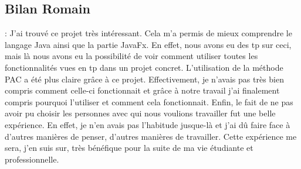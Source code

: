 \subsection{Bilan Romain} : 
J’ai trouvé ce projet très intéressant. Cela m’a permis de mieux comprendre le langage Java ainsi que la partie JavaFx. En effet, nous avons eu des tp sur ceci, mais là nous avons eu la possibilité de voir comment utiliser toutes les fonctionnalités vues en tp dans un projet concret. L’utilisation de la méthode PAC a été plus claire grâce à ce projet. Effectivement, je n’avais pas très bien compris comment celle-ci fonctionnait et grâce à notre travail j’ai finalement compris pourquoi l'utiliser et comment cela fonctionnait. Enfin, le fait de ne pas avoir pu choisir les personnes avec qui nous voulions travailler fut une belle expérience. En effet, je n’en avais pas l’habitude jusque-là et j’ai dû faire face à d’autres manières de penser, d’autres manières de travailler. Cette expérience me sera, j’en suis sur, très bénéfique pour la suite de ma vie étudiante et professionnelle.
